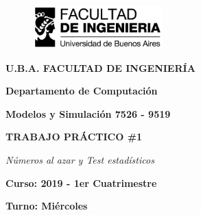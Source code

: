 \documentclass[11pt,a4paper]{article}
\author{cyn}
\begin{document}
\begin{titlepage}
\begin{center}
\vspace*{-1in}
\begin{figure}[htb]
\begin{flushleft}
\includegraphics[width=5cm]{imagenes/logo}
\end{flushleft}
\end{figure}
\begin{LARGE}
\textbf{U.B.A. FACULTAD DE INGENIERÍA}\\
\end{LARGE}
\vspace*{0.15in}
\begin{LARGE}
\textbf{Departamento de Computación}\\
\end{LARGE}
\vspace*{0.2in}
\begin{LARGE}
\textbf{Modelos y Simulación 7526 - 9519}\\
\end{LARGE}
\vspace*{0.2in}
\begin{Large}
\textbf{TRABAJO PRÁCTICO \#1}\\
\end{Large}
\vspace*{0.2in}
\begin{LARGE}
\textit{Números al azar y Test estadísticos }\\
\end{LARGE}
\vspace*{0.2in}
\begin{Large}
\raggedright\textbf{Curso: 2019 - 1er Cuatrimestre}\\
\end{Large}
\vspace*{0.1in}
\begin{Large}
\raggedright\textbf{Turno: Miércoles}\\
\end{Large}
\vspace*{0.1in}


\end{center}
\end{titlepage}
\end{document}
